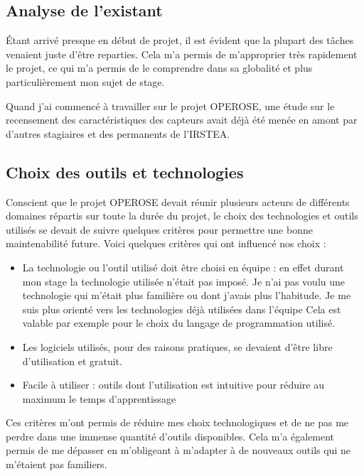 \subsection{Analyse de l’existant} 
Étant arrivé presque en début de projet, il est évident que la plupart des tâches venaient juste d’être reparties. Cela m’a permis de m’approprier très rapidement le projet, ce qui m’a permis de le comprendre dans sa globalité et plus particulièrement mon sujet de stage.   

Quand j’ai commencé à travailler sur le projet OPEROSE, une étude sur le recensement des caractéristiques des capteurs avait déjà été menée en amont par  d’autres stagiaires et des permanents de l’IRSTEA. 

\subsection{Choix des outils et technologies}

Conscient que le projet OPEROSE devait réunir plusieurs acteurs de différents domaines répartis sur toute la durée du projet, le choix des technologies et outils utilisés se devait de suivre quelques critères pour permettre une bonne maintenabilité future. Voici quelques critères qui ont influencé nos choix : 
\begin{itemize}
 

  \item La technologie ou l’outil utilisé doit être choisi en équipe : en effet durant mon stage la technologie  utilisée n’était pas imposé. Je n’ai pas  voulu une technologie qui m’était plus familière ou dont j’avais plus l’habitude. Je me suis plus orienté vers les technologies déjà utilisées dans l'équipe Cela est valable par exemple pour le choix du langage de programmation utilisé. 

  \item Les logiciels utilisés, pour des raisons pratiques, se devaient d’être libre d’utilisation et gratuit. 

   \item Facile à utiliser : outils dont l’utilisation est intuitive pour réduire au maximum le temps d’apprentissage 
\end{itemize}
Ces critères m'ont permis de réduire mes choix technologiques et de ne pas me perdre dans une immense quantité d'outils disponibles. Cela m'a également permis de me dépasser en m'obligeant à m'adapter à de nouveaux outils qui ne m'étaient pas familiers.

